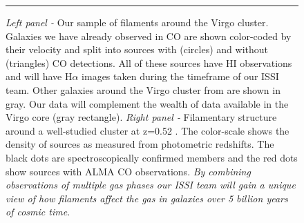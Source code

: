 \documentclass[11pt]{article}
\begin{document}
\begin{figure}
\begin{minipage}{.5\textwidth}
\end{minipage}
\vspace{-0.5cm}
\caption{\small{{\it Left panel - } Our sample of filaments around the Virgo cluster.  Galaxies we have already observed in CO are shown color-coded by their velocity and split into sources with (circles) and without (triangles) CO detections.  All of these sources have HI observations and will have H$\alpha$ images taken during the timeframe of our ISSI team. Other galaxies around the Virgo cluster from \citet{Kim16} are shown in gray.   Our data will complement the wealth of data available in the Virgo core (gray rectangle). {\it Right panel - } Filamentary structure around a well-studied cluster at z=0.52 .  The color-scale shows the density of sources as measured from photometric redshifts.  The black dots are spectroscopically confirmed members and the red dots show sources with ALMA CO observations.  \textit{By combining observations of multiple gas phases our ISSI team will gain a unique view of how filaments affect the gas in galaxies over 5 billion years of cosmic time.}}}
\label{fig:Fig1}
\vspace{0.2cm}
\hrule
\vspace{-0.5cm}
\end{figure}


\end{document}
